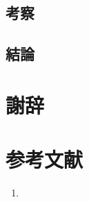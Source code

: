 \documentclass[11pt]{jsarticle}
\begin{document}
\subsection{考察}
\subsection{結論}
\section*{謝辞}
\section*{参考文献}
\begin{enumerate}
	\item
\end{enumerate}
\end{document}
